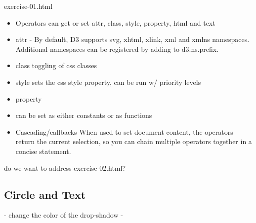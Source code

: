 \documentclass{beamer}
\begin{document}
\begin{frame}
\begin{block}{exercise-01.html}
\begin{itemize}
\begin{itemize}
                \item Operators can get or set attr, class, style, property, html and text
                \item attr - 
                By default, D3 supports svg, xhtml, xlink, xml and xmlns namespaces. Additional namespaces can be registered by adding to d3.ns.prefix.
                \item class
                toggling of css classes
                \item style
                sets the css style property, can be run w/ priority levels
                \item property
                \item can be set as either constants or as functions

                \item Cascading/callbacks
                When used to set document content, the operators return the current selection, so you can chain multiple operators together in a concise statement.
            \end{itemize}
        \end{itemize}
    \end{block}
\end{frame}

do we want to address exercise-02.html?



\subsection{Circle and Text}

- change the color of the drop-shadow
- 
\end{document}
